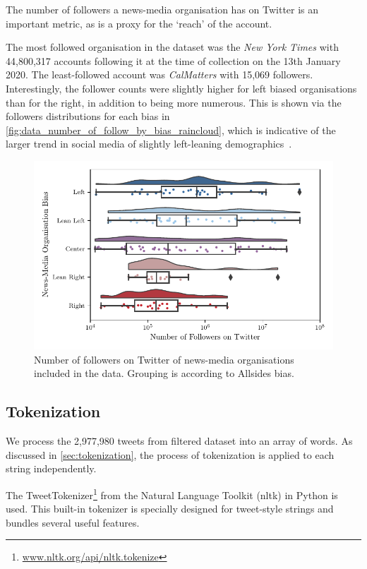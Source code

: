 The number of followers a news-media organisation has on Twitter is an important metric, as is a proxy for the `reach' of the account.

The most followed organisation in the dataset was the \emph{New York Times} with 44,800,317 accounts following it at the time of collection on the 13th January 2020. The least-followed account was \emph{CalMatters} with 15,069 followers. Interestingly, the follower counts were slightly higher for left biased organisations than for the right, in addition to being more numerous. This is shown via the followers distributions for each bias in \autoref{fig:data_number_of_follow_by_bias_raincloud}, which is indicative of the larger trend in social media of slightly left-leaning demographics~\cite{mellonTwitterFacebookAre2017}.

\begin{figure}[!htbp]
	\centering
	\includegraphics[width=\textwidth]{chapter1/figs/number_of_follow_by_bias_raincloud}
	\caption{Number of followers on Twitter of news-media organisations included in the data. Grouping is according to Allsides bias.}
	\label{fig:data_number_of_follow_by_bias_raincloud}
\end{figure}

\subsection{Tokenization}

We process the 2,977,980 tweets from filtered dataset into an array of words. As discussed in \autoref{sec:tokenization}, the process of tokenization is applied to each string independently.

The TweetTokenizer\footnote{\url{www.nltk.org/api/nltk.tokenize}} from the Natural Language Toolkit (nltk) in Python is used. This built-in tokenizer is specially designed for tweet-style strings and bundles several useful features.

